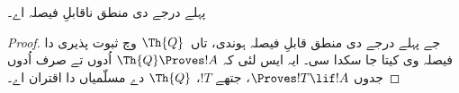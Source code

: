 \documentclass[../../../include/open-logic-section]{subfiles}
\begin{document}
\begin{cor}
پہلے درجے دی منطق ناقابلِ فیصلہ اے۔
\end{cor}

\begin{proof}
جے پہلے درجے دی منطق قابلِ فیصلہ ہوندی، تاں~$\Th{Q}$ وچ
ثبوت پذیری دا فیصلہ وی کیتا جا سکدا سی۔ ایہ ایس لئی کہ
$\Th{Q} \Proves !A$ اُدوں تے صرف اُدوں جدوں
$\Proves !T \lif !A$، جتھے $!T$، $\Th{Q}$ دے مسلّمیاں دا
اقتران اے۔
\end{proof}
\end{document}
